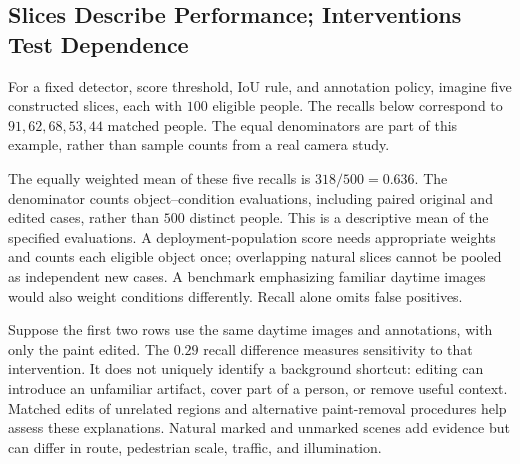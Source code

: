 \subsection{Slices Describe Performance; Interventions Test Dependence}

For a fixed detector, score threshold, IoU rule, and annotation policy, imagine five constructed slices, each with $100$ eligible people. The recalls below correspond to $91,62,68,53,44$ matched people. The equal denominators are part of this example, rather than sample counts from a real camera study.

\par\addvspace{\intextsep}\noindent\begin{minipage}{\linewidth}
\centering
{}
\label{fig:vision-shortcut-slices}
\label{tab:vision-slice-breakdown}
\end{minipage}\par\addvspace{\intextsep}

The equally weighted mean of these five recalls is $318/500=0.636$. The denominator counts object--condition evaluations, including paired original and edited cases, rather than $500$ distinct people. This is a descriptive mean of the specified evaluations. A deployment-population score needs appropriate weights and counts each eligible object once; overlapping natural slices cannot be pooled as independent new cases. A benchmark emphasizing familiar daytime images would also weight conditions differently. Recall alone omits false positives.

Suppose the first two rows use the same daytime images and annotations, with only the paint edited. The $0.29$ recall difference measures sensitivity to that intervention. It does not uniquely identify a background shortcut: editing can introduce an unfamiliar artifact, cover part of a person, or remove useful context. Matched edits of unrelated regions and alternative paint-removal procedures help assess these explanations. Natural marked and unmarked scenes add evidence but can differ in route, pedestrian scale, traffic, and illumination.

